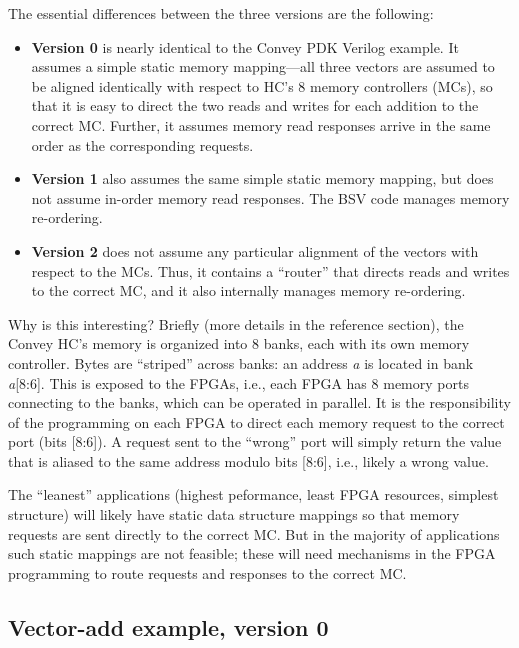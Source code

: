 \documentclass[twoside,letterpaper,11pt]{article}
\begin{document}
The essential differences between the three versions are the following:
\begin{itemize}

\item {\bf Version 0} is nearly identical to the Convey PDK Verilog
  example.  It assumes a simple static memory mapping---all three
  vectors are assumed to be aligned identically with respect to HC's 8
  memory controllers (MCs), so that it is easy to direct the two reads
  and writes for each addition to the correct MC.  Further, it assumes
  memory read responses arrive in the same order as the corresponding
  requests.

\item {\bf Version 1} also assumes the same simple static memory
  mapping, but does not assume in-order memory read responses.  The
  BSV code manages memory re-ordering.

\item {\bf Version 2} does not assume any particular alignment of the
  vectors with respect to the MCs.  Thus, it contains a ``router''
  that directs reads and writes to the correct MC, and it also
  internally manages memory re-ordering.

\end{itemize}

Why is this interesting?  Briefly (more details in the reference
section), the Convey HC's memory is organized into 8 banks, each with
its own memory controller.  Bytes are ``striped'' across banks: an
address \emph{a} is located in bank \emph{a}[8:6].  This is exposed to
the FPGAs, i.e., each FPGA has 8 memory ports connecting to the banks,
which can be operated in parallel.  It is the responsibility of the
programming on each FPGA to direct each memory request to the correct
port (bits [8:6]).  A request sent to the ``wrong'' port will simply
return the value that is aliased to the same address modulo bits
[8:6], i.e., likely a wrong value.

The ``leanest'' applications (highest peformance, least FPGA
resources, simplest structure) will likely have static data structure
mappings so that memory requests are sent directly to the correct MC.
But in the majority of applications such static mappings are not
feasible; these will need mechanisms in the FPGA programming to route
requests and responses to the correct MC.


\subsection{Vector-add example, version 0}
\end{document}
